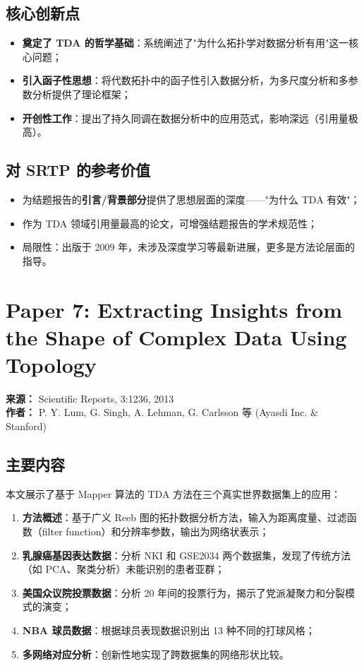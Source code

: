 \documentclass[11pt,a4paper]{article}
\begin{document}
\subsection*{核心创新点}
\begin{itemize}[nosep]
  \item \textbf{奠定了 TDA 的哲学基础}：系统阐述了"为什么拓扑学对数据分析有用"这一核心问题；
  \item \textbf{引入函子性思想}：将代数拓扑中的函子性引入数据分析，为多尺度分析和多参数分析提供了理论框架；
  \item \textbf{开创性工作}：提出了持久同调在数据分析中的应用范式，影响深远（引用量极高）。
\end{itemize}

\subsection*{对 SRTP 的参考价值}
\begin{itemize}[nosep]
  \item 为结题报告的\textbf{引言/背景部分}提供了思想层面的深度——"为什么 TDA 有效"；
  \item 作为 TDA 领域引用量最高的论文，可增强结题报告的学术规范性；
  \item 局限性：出版于 2009 年，未涉及深度学习等最新进展，更多是方法论层面的指导。
\end{itemize}


\section{Paper 7: Extracting Insights from the Shape of Complex Data Using Topology}

\textbf{来源：} Scientific Reports, 3:1236, 2013 \\
\textbf{作者：} P. Y. Lum, G. Singh, A. Lehman, G. Carlsson 等 (Ayasdi Inc. \& Stanford)

\subsection*{主要内容}
本文展示了基于 Mapper 算法的 TDA 方法在三个真实世界数据集上的应用：

\begin{enumerate}[nosep]
  \item \textbf{方法概述}：基于广义 Reeb 图的拓扑数据分析方法，输入为距离度量、过滤函数（filter function）和分辨率参数，输出为网络状表示；
  \item \textbf{乳腺癌基因表达数据}：分析 NKI 和 GSE2034 两个数据集，发现了传统方法（如 PCA、聚类分析）未能识别的患者亚群；
  \item \textbf{美国众议院投票数据}：分析 20 年间的投票行为，揭示了党派凝聚力和分裂模式的演变；
  \item \textbf{NBA 球员数据}：根据球员表现数据识别出 13 种不同的打球风格；
  \item \textbf{多网络对应分析}：创新性地实现了跨数据集的网络形状比较。
\end{enumerate}
\end{document}
